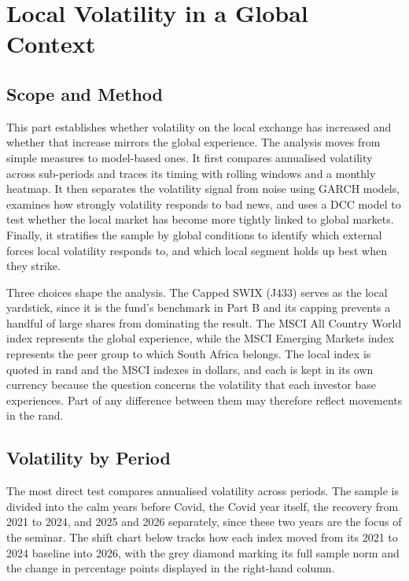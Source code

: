 \documentclass[11pt,preprint]{elsarticle}
\numberwithin{equation}{section}
\numberwithin{figure}{section}
\numberwithin{table}{section}
\begin{document}
\section{\texorpdfstring{Local Volatility in a Global Context
\label{PartA}}{Local Volatility in a Global Context }}\label{local-volatility-in-a-global-context}

\subsection{Scope and Method}\label{scope-and-method}

This part establishes whether volatility on the local exchange has
increased and whether that increase mirrors the global experience. The
analysis moves from simple measures to model-based ones. It first
compares annualised volatility across sub-periods and traces its timing
with rolling windows and a monthly heatmap. It then separates the
volatility signal from noise using GARCH models, examines how strongly
volatility responds to bad news, and uses a DCC model to test whether
the local market has become more tightly linked to global markets.
Finally, it stratifies the sample by global conditions to identify which
external forces local volatility responds to, and which local segment
holds up best when they strike.

Three choices shape the analysis. The Capped SWIX (J433) serves as the
local yardstick, since it is the fund's benchmark in Part B and its
capping prevents a handful of large shares from dominating the result.
The MSCI All Country World index represents the global experience, while
the MSCI Emerging Markets index represents the peer group to which South
Africa belongs. The local index is quoted in rand and the MSCI indexes
in dollars, and each is kept in its own currency because the question
concerns the volatility that each investor base experiences. Part of any
difference between them may therefore reflect movements in the rand.

\subsection{Volatility by Period}\label{volatility-by-period}

The most direct test compares annualised volatility across periods. The
sample is divided into the calm years before Covid, the Covid year
itself, the recovery from 2021 to 2024, and 2025 and 2026 separately,
since these two years are the focus of the seminar. The shift chart
below tracks how each index moved from its 2021 to 2024 baseline into
2026, with the grey diamond marking its full sample norm and the change
in percentage points displayed in the right-hand column.
\end{document}
